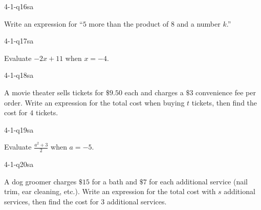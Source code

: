 
\begin{practiceQuestion}{4-1-q16}{sa}
\begin{questionText}
Write an expression for ``$5$ more than the product of $8$ and a number $k$.''
\end{questionText}
\end{practiceQuestion}

\begin{practiceQuestion}{4-1-q17}{sa}
\begin{questionText}
Evaluate $-2x + 11$ when $x = -4$.
\end{questionText}
\end{practiceQuestion}

\begin{practiceQuestion}{4-1-q18}{sa}
\begin{questionText}
A movie theater sells tickets for $\$9.50$ each and charges a $\$3$ convenience fee per order. Write an expression for the total cost when buying $t$ tickets, then find the cost for $4$ tickets.
\end{questionText}
\end{practiceQuestion}

\begin{practiceQuestion}{4-1-q19}{sa}
\begin{questionText}
Evaluate $\frac{a^2 + 3}{2}$ when $a = -5$.
\end{questionText}
\end{practiceQuestion}

\begin{practiceQuestion}{4-1-q20}{sa}
\begin{questionText}
A dog groomer charges $\$15$ for a bath and $\$7$ for each additional service (nail trim, ear cleaning, etc.). Write an expression for the total cost with $s$ additional services, then find the cost for $3$ additional services.
\end{questionText}
\end{practiceQuestion}

